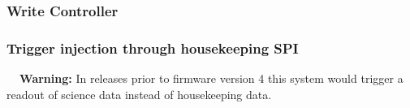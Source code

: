 \documentclass[a4paper,indent]{paper}
\newenvironment{warn}
{\par\begin{mdframed}[linewidth=2pt,linecolor=orange,backgroundcolor=orange!10]%
    \begin{list}{}{\leftmargin=0mm}\item[\bf\danger{}~~Warning: ]}
  {\end{list}\end{mdframed}\par}
\begin{document}
\subsubsection{Write Controller}
%
%
%
%
%
%
%
%



\subsubsection{Trigger injection through housekeeping \ac{SPI}}
\begin{warn}
  In releases prior to firmware version 4 this system would trigger a readout of science data instead of housekeeping data.
\end{warn}
\end{document}

